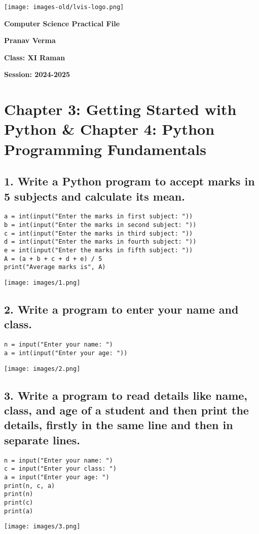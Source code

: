 \documentclass[12pt]{article}
\begin{document}
\begin{titlepage}
    \texttt{[image: images-old/lvis-logo.png]}
    \centering
    \vspace*{2cm}

    \Huge\textbf{Computer Science Practical File}

    \vspace{1cm}
    \LARGE\textbf{Pranav Verma}

    \vfill

    \Large\textbf{Class: XI Raman}

    \vspace{2cm}

    \Large\textbf{Session: 2024-2025}
\end{titlepage}

\tableofcontents


\section*{Chapter 3: Getting Started with Python \& Chapter 4: Python Programming Fundamentals}

\subsection*{1. Write a Python program to accept marks in 5 subjects and calculate its mean.}
\begin{verbatim}
a = int(input("Enter the marks in first subject: "))
b = int(input("Enter the marks in second subject: "))
c = int(input("Enter the marks in third subject: "))
d = int(input("Enter the marks in fourth subject: "))
e = int(input("Enter the marks in fifth subject: "))
A = (a + b + c + d + e) / 5
print("Average marks is", A)
\end{verbatim}
\texttt{[image: images/1.png]}

\subsection*{2. Write a program to enter your name and class.}
\begin{verbatim}
n = input("Enter your name: ")
a = int(input("Enter your age: "))
\end{verbatim}
\texttt{[image: images/2.png]}

\subsection*{3. Write a program to read details like name, class, and age of a student and then print the details, firstly in the same line and then in separate lines.}
\begin{verbatim}
n = input("Enter your name: ")
c = input("Enter your class: ")
a = input("Enter your age: ")
print(n, c, a)
print(n)
print(c)
print(a)
\end{verbatim}
\texttt{[image: images/3.png]}
\end{document}
